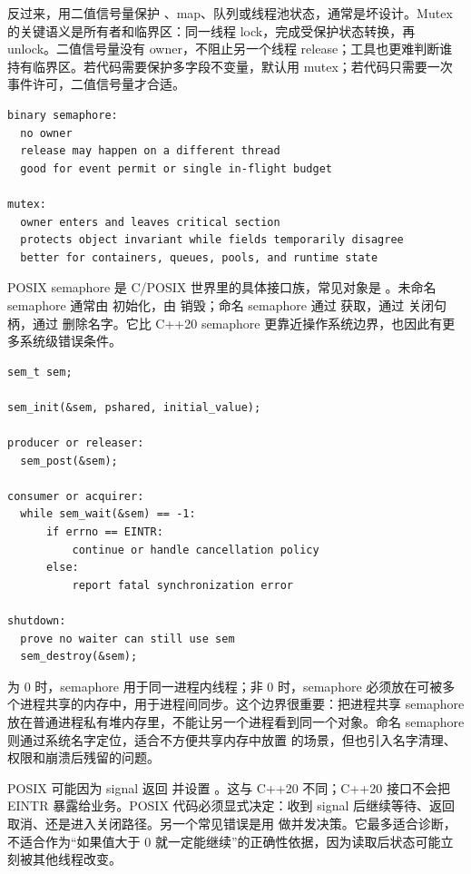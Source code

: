 反过来，用二值信号量保护 、map、队列或线程池状态，通常是坏设计。Mutex 的关键语义是所有者和临界区：同一线程 lock，完成受保护状态转换，再 unlock。二值信号量没有 owner，不阻止另一个线程 release；工具也更难判断谁持有临界区。若代码需要保护多字段不变量，默认用 mutex；若代码只需要一次事件许可，二值信号量才合适。

\begin{lstlisting}[numbers=none,caption={binary semaphore 和 mutex 的边界}]
binary semaphore:
  no owner
  release may happen on a different thread
  good for event permit or single in-flight budget

mutex:
  owner enters and leaves critical section
  protects object invariant while fields temporarily disagree
  better for containers, queues, pools, and runtime state
\end{lstlisting}

POSIX semaphore 是 C/POSIX 世界里的具体接口族，常见对象是 。未命名 semaphore 通常由  初始化，由  销毁；命名 semaphore 通过  获取，通过  关闭句柄，通过  删除名字。它比 C++20 semaphore 更靠近操作系统边界，也因此有更多系统级错误条件。

\begin{lstlisting}[numbers=none,caption={POSIX unnamed semaphore 的基本形态}]
sem_t sem;

sem_init(&sem, pshared, initial_value);

producer or releaser:
  sem_post(&sem);

consumer or acquirer:
  while sem_wait(&sem) == -1:
      if errno == EINTR:
          continue or handle cancellation policy
      else:
          report fatal synchronization error

shutdown:
  prove no waiter can still use sem
  sem_destroy(&sem);
\end{lstlisting}

 为 0 时，semaphore 用于同一进程内线程；非 0 时，semaphore 必须放在可被多个进程共享的内存中，用于进程间同步。这个边界很重要：把进程共享 semaphore 放在普通进程私有堆内存里，不能让另一个进程看到同一个对象。命名 semaphore 则通过系统名字定位，适合不方便共享内存中放置  的场景，但也引入名字清理、权限和崩溃后残留的问题。

POSIX  可能因为 signal 返回  并设置 。这与 C++20  不同；C++20 接口不会把 EINTR 暴露给业务。POSIX 代码必须显式决定：收到 signal 后继续等待、返回取消、还是进入关闭路径。另一个常见错误是用  做并发决策。它最多适合诊断，不适合作为“如果值大于 0 就一定能继续”的正确性依据，因为读取后状态可能立刻被其他线程改变。


